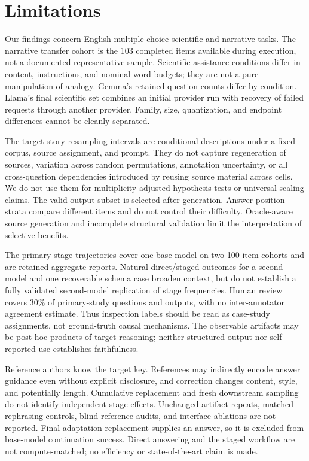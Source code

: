 \section*{Limitations}
Our findings concern English multiple-choice scientific and narrative tasks. The narrative transfer cohort is the 103 completed items available during execution, not a documented representative sample. Scientific assistance conditions differ in content, instructions, and nominal word budgets; they are not a pure manipulation of analogy. Gemma's retained question counts differ by condition. Llama's final scientific set combines an initial provider run with recovery of failed requests through another provider. Family, size, quantization, and endpoint differences cannot be cleanly separated.

The target-story resampling intervals are conditional descriptions under a fixed corpus, source assignment, and prompt. They do not capture regeneration of sources, variation across random permutations, annotation uncertainty, or all cross-question dependencies introduced by reusing source material across cells. We do not use them for multiplicity-adjusted hypothesis tests or universal scaling claims. The valid-output subset is selected after generation. Answer-position strata compare different items and do not control their difficulty. Oracle-aware source generation and incomplete structural validation limit the interpretation of selective benefits.

The primary stage trajectories cover one base model on two 100-item cohorts and are retained aggregate reports. Natural direct/staged outcomes for a second model and one recoverable schema case broaden context, but do not establish a fully validated second-model replication of stage frequencies. Human review covers 30\% of primary-study questions and outputs, with no inter-annotator agreement estimate. Thus inspection labels should be read as case-study assignments, not ground-truth causal mechanisms. The observable artifacts may be post-hoc products of target reasoning; neither structured output nor self-reported use establishes faithfulness.

Reference authors know the target key. References may indirectly encode answer guidance even without explicit disclosure, and correction changes content, style, and potentially length. Cumulative replacement and fresh downstream sampling do not identify independent stage effects. Unchanged-artifact repeats, matched rephrasing controls, blind reference audits, and interface ablations are not reported. Final adaptation replacement supplies an answer, so it is excluded from base-model continuation success. Direct answering and the staged workflow are not compute-matched; no efficiency or state-of-the-art claim is made.

